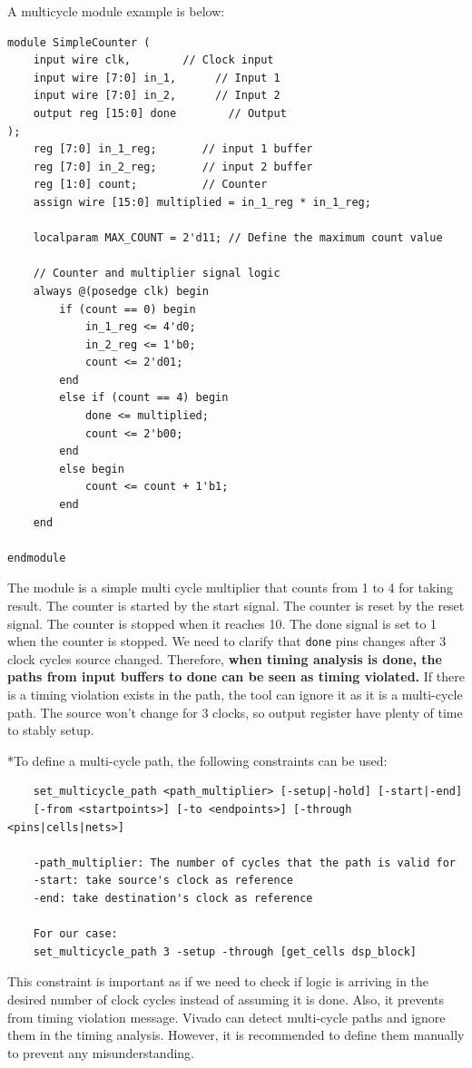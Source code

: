 \documentclass{report}
\begin{document}
A multicycle module example is below:
\begin{verbatim}
module SimpleCounter (
    input wire clk,        // Clock input
    input wire [7:0] in_1,      // Input 1
    input wire [7:0] in_2,      // Input 2
    output reg [15:0] done        // Output
);
    reg [7:0] in_1_reg;       // input 1 buffer
    reg [7:0] in_2_reg;       // input 2 buffer
    reg [1:0] count;          // Counter
    assign wire [15:0] multiplied = in_1_reg * in_1_reg;
    
    localparam MAX_COUNT = 2'd11; // Define the maximum count value

    // Counter and multiplier signal logic
    always @(posedge clk) begin
        if (count == 0) begin
            in_1_reg <= 4'd0;
            in_2_reg <= 1'b0;
            count <= 2'd01;
        end
        else if (count == 4) begin
            done <= multiplied;
            count <= 2'b00;
        end
        else begin
            count <= count + 1'b1;
        end
    end

endmodule
\end{verbatim}
The module is a simple multi cycle multiplier that counts from 1 to 4 for taking result. The counter is started by the start signal. The counter is reset by the reset signal. The counter is stopped when it reaches 10. The done signal is set to 1 when the counter is stopped. 
We need to clarify that \texttt{done} pins changes after 3 clock cycles source changed. Therefore, \textbf{when timing analysis is done, the paths from input buffers to done can be seen as timing violated.} If there is a timing violation exists in the path, the tool can ignore it as it is a multi-cycle path. The source won't change for 3 clocks, so output register have plenty of time to stably setup.

*To define a multi-cycle path, the following constraints can be used:
\begin{verbatim}
    set_multicycle_path <path_multiplier> [-setup|-hold] [-start|-end]
    [-from <startpoints>] [-to <endpoints>] [-through <pins|cells|nets>]

    -path_multiplier: The number of cycles that the path is valid for
    -start: take source's clock as reference
    -end: take destination's clock as reference

    For our case:
    set_multicycle_path 3 -setup -through [get_cells dsp_block]
\end{verbatim}
    This constraint is important as if we need to check if logic is arriving in the desired number of clock cycles instead of assuming it is done. Also, it prevents from timing violation message. Vivado can detect multi-cycle paths and ignore them in the timing analysis. However, it is recommended to define them manually to prevent any misunderstanding.
\end{document}
